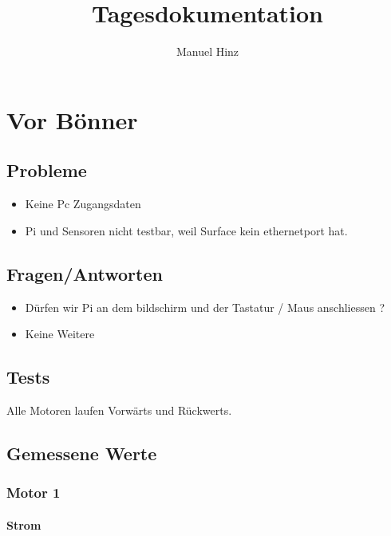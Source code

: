\documentclass{article}
\author{Manuel Hinz}
\title{Tagesdokumentation}
\begin{document}
\maketitle

\section{Vor B\"{o}nner}

\subsection{Probleme}

\begin{itemize}

\item Keine Pc Zugangsdaten

\item Pi und Sensoren nicht testbar, weil Surface kein ethernetport hat.

\end{itemize}

\subsection{Fragen/Antworten}

\begin{itemize}

\item D\"{u}rfen wir Pi an dem bildschirm und der Tastatur / Maus anschliessen ?  

\item Keine Weitere

\end{itemize}

\subsection{Tests}

Alle Motoren laufen Vorwärts und Rückwerts.

\subsection{Gemessene Werte}

\subsubsection{Motor 1}

\paragraph{Strom}
\end{document}
